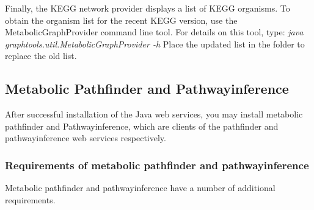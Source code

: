\documentclass{book}
\begin{document}
Finally, the KEGG network provider displays a list of KEGG organisms. To obtain the
organism list for the recent KEGG version, use the MetabolicGraphProvider command line
tool. For details on this tool, type: \textit{java graphtools.util.MetabolicGraphProvider -h}
Place the updated list in the folder  to replace the old list.

\subsection{Metabolic Pathfinder and Pathwayinference}
After successful installation of the Java web services, you may install metabolic pathfinder
and Pathwayinference, which are clients of the pathfinder and pathwayinference web services respectively.

\subsubsection{Requirements of metabolic pathfinder and pathwayinference}

Metabolic pathfinder and pathwayinference have a number of additional requirements.
\end{document}
